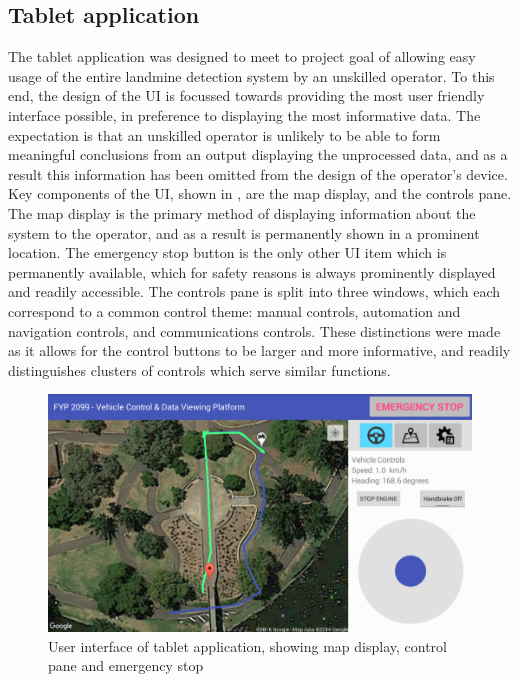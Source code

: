 \documentclass[main.tex]{subfiles}
\begin{document}
\subsection{Tablet application}
The tablet application was designed to meet to project goal of allowing easy usage of the entire landmine detection system by an unskilled operator. To this end, the design of the UI is focussed towards providing the most user friendly interface possible, in preference to displaying the most informative data. The expectation is that an unskilled operator is unlikely to be able to form meaningful conclusions from an output displaying the unprocessed data, and as a result this information has been omitted from the design of the operator’s device. 
%
Key components of the UI, shown in , are the map display, and the controls pane. The map display is the primary method of displaying information about the system to the operator, and as a result is permanently shown in a prominent location. The emergency stop button is the only other UI item which is permanently available, which for safety reasons is always prominently displayed and readily accessible. The controls pane is split into three windows, which each correspond to a common control theme: manual controls, automation and navigation controls, and communications controls. These distinctions were made as it allows for the control buttons to be larger and more informative, and readily distinguishes clusters of controls which serve similar functions. 

\begin{figure}[ht]
\includegraphics[width=\textwidth]{4-DetailedDesign/controlApp.PNG}
\centering
\caption[User interface of tablet application]{User interface of tablet application, showing map display, control pane and emergency stop}
\end{figure}
\end{document}
